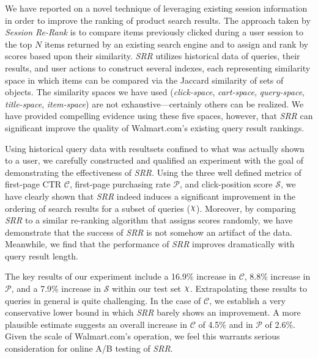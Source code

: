 \documentclass{article}
\def\Chi{\raisebox{2pt}{$\chi$}}
\begin{document}
We have reported on a novel technique of leveraging existing session
information in order to improve the ranking of product search results. The
approach taken by {\em Session Re-Rank} is to compare items previously clicked
during a user session to the top $N$ items returned by an existing search
engine and to assign and rank by scores based upon their similarity. {\em SRR}
utilizes historical data of queries, their results, and user actions to
construct several indexes, each representing similarity space in which items
can be compared via the Jaccard similarity of sets of objects. The similarity
spaces we have used ({\em click-space}, {\em cart-space}, {\em query-space}, 
{\em title-space}, {\em item-space}) are not exhaustive---certainly others
can be realized. We have provided compelling evidence using these five spaces,
however, that {\em SRR} can significant improve the quality of Walmart.com's
existing query result rankings. 

Using historical query data with resultsets confined to what was actually shown
to a user, we carefully constructed and qualified an experiment with the goal
of demonstrating the effectiveness of {\em SRR}. Using the
three well defined metrics of first-page CTR $\mathscr{C}$, first-page
purchasing rate $\mathscr{P}$, and click-position score $\mathscr{S}$,
we have clearly shown that {\em SRR} indeed induces a significant improvement
in the ordering of search results for a subset of queries ($\Chi$). Moreover,
by comparing {\em SRR} to a similar re-ranking algorithm that assigns scores
randomly, we have demonstrate that the success of {\em SRR} is not somehow an
artifact of the data. Meanwhile, we find that the performance of {\em SRR}
improves dramatically with query result length.

The key results of our experiment include a 16.9\% increase in $\mathscr{C}$, 
8.8\% increase in $\mathscr{P}$, and a 7.9\% increase in $\mathscr{S}$ within
our test set $\Chi$. Extrapolating these results to queries in general is
quite challenging. In the case of $\mathscr{C}$, we establish a very conservative
lower bound in which {\em SRR} barely shows an improvement. A more plausible
estimate suggests an overall increase in $\mathscr{C}$ of 4.5\% and in $\mathscr{P}$
of 2.6\%. Given the scale of Walmart.com's operation, we feel this warrants
serious consideration for online A/B testing of {\em SRR}.
\end{document}
